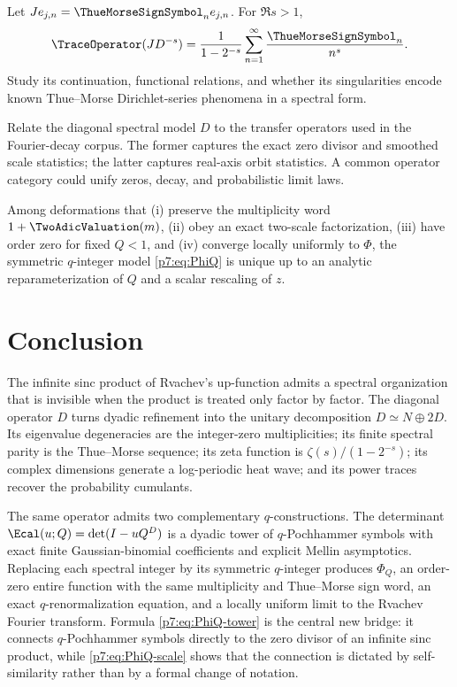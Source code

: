 \documentclass[11pt]{article}
\numberwithin{equation}{section}
\theoremstyle{definition}
\theoremstyle{remark}
\begin{document}
\begin{problem}
Let $J e_{j,n}=\ThueMorseSignSymbol_n e_{j,n}$.  For $\Re s>1$,
\begin{equation}\label{p7:eq:twisted-zeta}
 \TraceOperator(JD^{-s})
 =\frac{1}{1-2^{-s}}
 \sum_{n=1}^{\infty}\frac{\ThueMorseSignSymbol_n}{n^s}.
\end{equation}
Study its continuation, functional relations, and whether its singularities encode known Thue--Morse Dirichlet-series phenomena in a spectral form.
\end{problem}

\begin{problem}
Relate the diagonal spectral model $D$ to the transfer operators used in the Fourier-decay corpus.  The former captures the exact zero divisor and smoothed scale statistics; the latter captures real-axis orbit statistics.  A common operator category could unify zeros, decay, and probabilistic limit laws.
\end{problem}

\begin{conjecture}
Among deformations that (i) preserve the multiplicity word $1+\TwoAdicValuation(m)$, (ii) obey an exact two-scale factorization, (iii) have order zero for fixed $Q<1$, and (iv) converge locally uniformly to $\Phi$, the symmetric $q$-integer model \cref{p7:eq:PhiQ} is unique up to an analytic reparameterization of $Q$ and a scalar rescaling of $z$.
\end{conjecture}

\section{Conclusion}

The infinite sinc product of Rvachev's up-function admits a spectral organization that is invisible when the product is treated only factor by factor.  The diagonal operator $D$ turns dyadic refinement into the unitary decomposition $D\simeq N\oplus2D$.  Its eigenvalue degeneracies are the integer-zero multiplicities; its finite spectral parity is the Thue--Morse sequence; its zeta function is $\zeta(s)/(1-2^{-s})$; its complex dimensions generate a log-periodic heat wave; and its power traces recover the probability cumulants.

The same operator admits two complementary $q$-constructions.  The determinant $\Ecal(u;Q)=\det(I-uQ^D)$ is a dyadic tower of $q$-Pochhammer symbols with exact finite Gaussian-binomial coefficients and explicit Mellin asymptotics.  Replacing each spectral integer by its symmetric $q$-integer produces $\Phi_Q$, an order-zero entire function with the same multiplicity and Thue--Morse sign word, an exact $q$-renormalization equation, and a locally uniform limit to the Rvachev Fourier transform.  Formula \cref{p7:eq:PhiQ-tower} is the central new bridge: it connects $q$-Pochhammer symbols directly to the zero divisor of an infinite sinc product, while \cref{p7:eq:PhiQ-scale} shows that the connection is dictated by self-similarity rather than by a formal change of notation.
\end{document}
